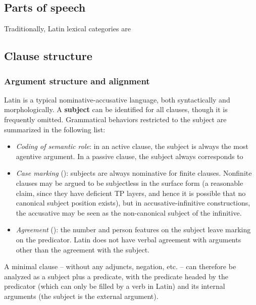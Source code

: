 \documentclass{article}
\newcommand*{\concept}[1]{\textbf{#1}}
\begin{document}
\subsection{Parts of speech}

Traditionally, Latin lexical categories are 

\subsection{Clause structure}\label{sec:clause-structure-abs}

\subsubsection{Argument structure and alignment}\label{sec:alignment-abs}

Latin is a typical nominative-accusative language, both syntactically and morphologically.
A \concept{subject} can be identified for all clauses, though it is frequently omitted.
Grammatical behaviors restricted to the subject are summarized in the following list: 
\begin{itemize}
    \item \emph{Coding of semantic role}: in an active clause, 
    the subject is always the most agentive argument.
    In a passive clause, the subject always corresponds to %
    \item \emph{Case marking} (): 
    subjects are always nominative for finite clauses. 
    Nonfinite clauses may be argued to be subjectless in the surface form 
    (a reasonable claim, since they have deficient TP layers, 
    and hence it is possible that no canonical subject position exists),
    but in accusative-infinitive constructions, %
    the accusative may be seen as the non-canonical subject of the infinitive.
    \item \emph{Agreement} (): 
    the number and person features on the subject leave marking on the predicator.
    Latin does not have verbal agreement with arguments other than the agreement with the subject.
\end{itemize}

A minimal clause -- without any adjuncts, negation, etc. -- can therefore be analyzed as 
a subject plus a predicate,
with the predicate headed by the predicator (which can only be filled by a verb in Latin) 
and its internal arguments
(the subject is the external argument).
\end{document}
